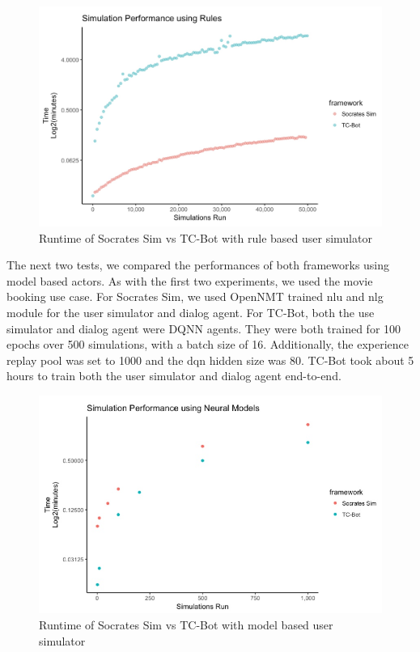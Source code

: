 \begin{figure}[h!]
	\label{fig:rules_test}
	\includegraphics[width=\linewidth]{diagrams/rules_perf_test.jpeg}
	\caption{ Runtime of Socrates Sim vs TC-Bot with rule based user simulator}
\end{figure}

The next two tests, we compared the performances of both frameworks using model based actors. As with the first two experiments, we used the movie booking use case. For Socrates Sim, we used OpenNMT trained nlu and nlg module for the user simulator and dialog agent. For TC-Bot, both the use simulator and dialog agent were DQNN agents. They were both trained for 100 epochs over 500 simulations, with a batch size of 16. Additionally, the experience replay pool was set to 1000 and the dqn hidden size was 80. TC-Bot took about 5 hours to train both the user simulator and dialog agent end-to-end.

\begin{figure}[h!]
	\label{fig:nm_test}
	\includegraphics[width=\linewidth]{diagrams/neural_perf_test.jpeg}
	\caption{ Runtime of Socrates Sim vs TC-Bot with model based user simulator }
\end{figure}

